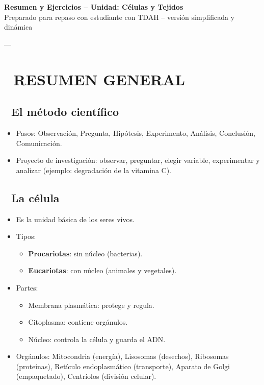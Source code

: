 \documentclass[a4paper,12pt]{article}
\begin{document}
\begin{center}
\Large{\textbf{Resumen y Ejercicios – Unidad: Células y Tejidos}} \\
\vspace{0.3cm}
\small{Preparado para repaso con estudiante con TDAH – versión simplificada y dinámica}
\end{center}

---

\section*{🧠 RESUMEN GENERAL}

\subsection*{🔬 El método científico}
\begin{itemize}
    \item Pasos: Observación, Pregunta, Hipótesis, Experimento, Análisis, Conclusión, Comunicación.
    \item Proyecto de investigación: observar, preguntar, elegir variable, experimentar y analizar (ejemplo: degradación de la vitamina C).
\end{itemize}

\subsection*{🧫 La célula}
\begin{itemize}
    \item Es la unidad básica de los seres vivos.
    \item Tipos:
    \begin{itemize}
        \item \textbf{Procariotas}: sin núcleo (bacterias).
        \item \textbf{Eucariotas}: con núcleo (animales y vegetales).
    \end{itemize}
    \item Partes:
    \begin{itemize}
        \item Membrana plasmática: protege y regula.
        \item Citoplasma: contiene orgánulos.
        \item Núcleo: controla la célula y guarda el ADN.
    \end{itemize}
    \item Orgánulos: Mitocondria (energía), Lisosomas (desechos), Ribosomas (proteínas), Retículo endoplasmático (transporte), Aparato de Golgi (empaquetado), Centríolos (división celular).
\end{itemize}
\end{document}
